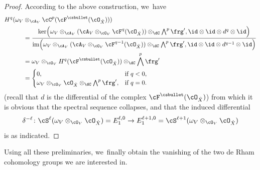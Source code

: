 \begin{proof}
According to the above construction, we~have
\begin{align*}
H^q(\omega_V&\otimes_{\cA_V}
\cC^p(\cF^{\csbullet}(\cO_{\hat{X}})))\\
&=\frac{\ker\Bigl(\omega_V\otimes_{\cA_V}(\cA_V\otimes_{\cO_V}\cF^q(\cO_{\hat{X}}))\otimes_\dC\bigwedge^p\frg',\id\otimes\id\otimes d^q\otimes\id\Bigr)}{\textup{im}\Bigl(\omega_V\otimes_{\cA_V}(\cA_V\otimes_{\cO_V}\cF^{q-1}(\cO_{\hat{X}}))\otimes_\dC\bigwedge^p\frg',\id\otimes\id\otimes d^{q-1}\otimes\id\Bigr)}\\
&= \omega_V\otimes_{\cO_V} H^q(\cF^{\csbullet}(\cO_{\hat{X}}))\otimes_\dC\bigwedge^p \frg'\\
&=
\begin{cases}
0, &\text{if }q<0,\\
\omega_V\otimes_{\cO_V}\cO_{\hat{X}}\otimes_\dC\bigwedge^p \frg', &\text{if }q=0.
\end{cases}
\end{align*}
(recall that $d$ is the differential of the complex $\cF^{\csbullet}(\cO_{\hat{X}})$)
from which it is obvious that the spectral sequence collapses, and that the induced differential
\[
\delta^{-\ell} \colon \cS^\ell(\omega_V\otimes_{\cO_V}\cO_{\hat{X}})=E_1^{\ell,0}\to E_1^{\ell+1,0}=\cS^{\ell+1}(\omega_V\otimes_{\cO_V}\cO_{\hat{X}})
\]
is as indicated.
\end{proof}

Using all these preliminaries, we~finally obtain the vanishing of the two de Rham cohomology groups we are interested in.


